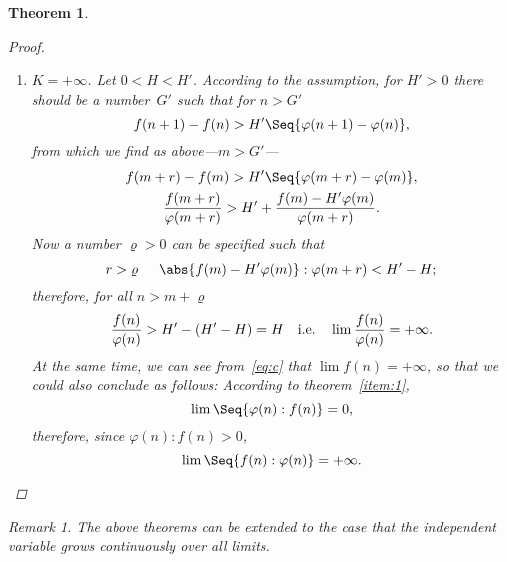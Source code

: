 \documentclass[a4paper]{amsbook}
\newtheorem*{theorem*}{Theorem}
\theoremstyle{remark}
\newtheorem*{remark}{Remark}
\begin{document}
\begin{theorem*}
\begin{proof}
\begin{enumerate}[label=\alph*)]
\begin{equation}
        \qfor
        r > \varrho.
      \end{equation}
      We therefore have
      \begin{equation}
        \label{eq:b}
        \abs*{\frac{f(m+r)}{\varphi(m+r)} - K} < 2\varepsilon
      \end{equation}
      or \(\abs{f(n):\varphi(n) — K} < 2\varepsilon\) for all \(n > m+\varrho\).  Now then, the number \(2\varepsilon\), which can be any positive number, indeed corresponds to the number \(m+\varrho\), since \(m\) results from \(\varepsilon\) initially and after \(m\) the number \(\varrho\) from \(\varepsilon\).  Thus we have
      \begin{equation*}
        \lim f(n):\varphi(n) = K
      \end{equation*}
      for \(\lim n = +\infty\).
    \item \(K = +\infty\).  Let \(0 < H < H'\).  According to the assumption, for \(H' > 0\) there should be a number~\(G'\) such that for \(n>G'\)
      \begin{equation*}
        f(n+1) - f(n) > H' \Seq{\varphi(n+1)-\varphi(n)},
      \end{equation*}
      from which we find as above---\(m > G'\)---
      \begin{gather}
        \label{eq:c}
        f(m+r) - f(m) > H' \Seq{\varphi(m+r)-\varphi(m)}, \\
        \frac{f(m+r)}{\varphi(m+r)}
        > H' + \frac{f(m)-H'\varphi(m)}{\varphi(m+r)}.
        \nonumber
      \end{gather}
      Now a number \(\varrho > 0\) can be specified such that
      \begin{equation*}
        r > \varrho
        \hspace{1.5em}
        \abs{f(m) - H' \varphi(m)}:\varphi(m+r) < H' - H;
      \end{equation*}
      therefore, for all \(n > m + \varrho\)
      \begin{equation*}
        \frac{f(n)}{\varphi(n)} > H' - (H' - H) = H
        \quad \text{i.e.} \quad
        \lim\frac{f(n)}{\varphi(n)} = +\infty.
      \end{equation*}
      At the same time, we can see from~\eqref{eq:c} that \(\lim f(n) = +\infty\), so that we could also conclude as follows: According to theorem~\ref{item:1},
      \begin{equation*}
        \lim\Seq{\varphi(n):f(n)} = 0,
      \end{equation*}
      therefore, since \(\varphi(n):f(n) > 0\),
      \begin{equation*}
        \lim\Seq{f(n):\varphi(n)} = +\infty.
        \qedhere
      \end{equation*}
    \end{enumerate}
  \end{proof}
  \begin{remark}
    The above theorems can be extended to the case that the independent variable grows continuously over all limits.
  \end{remark}
\end{theorem*}
\end{document}
